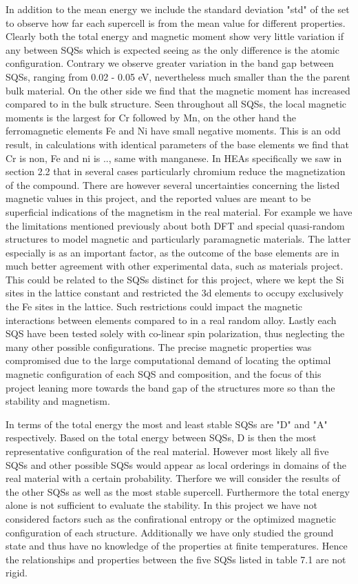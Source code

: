 In addition to the mean energy we include the standard deviation "std" of the set to observe how far each supercell is from the mean value for different properties. Clearly both the total energy and magnetic moment show very little variation if any between SQSs which is expected seeing as the only difference is the atomic configuration. Contrary we observe greater variation in the band gap between SQSs, ranging from 0.02 - 0.05 eV, nevertheless much smaller than the the parent bulk material. On the other side we find that the magnetic moment has increased compared to in the bulk structure. Seen throughout all SQSs, the local magnetic moments is the largest for Cr followed by Mn, on the other hand the ferromagnetic elements Fe and Ni have small negative moments. This is an odd result, in calculations with identical parameters of the base elements we find that Cr is non, Fe and ni is .., same with manganese. In HEAs specifically we saw in section 2.2 that in several cases particularly chromium reduce the magnetization of the compound. There are however several uncertainties concerning the listed magnetic values in this project, and the reported values are meant to be superficial indications of the magnetism in the real material. For example we have the limitations mentioned previously about both DFT and special quasi-random structures to model magnetic and particularly paramagnetic materials. The latter especially is as an important factor, as the outcome of the base elements are in much better agreement with other experimental data, such as materials project. This could be related to the SQSs distinct for this project, where we kept the Si sites in the lattice constant and restricted the 3d elements to occupy exclusively the Fe sites in the lattice. Such restrictions could impact the magnetic interactions between elements compared to in a real random alloy.  Lastly each SQS have been tested solely with co-linear spin polarization, thus neglecting the many other possible configurations. The precise magnetic properties was compromised due to the large computational demand of locating the optimal magnetic configuration of each SQS and composition, and the focus of this project leaning more towards the band gap of the structures more so than the stability and magnetism. 

  
In terms of the total energy the most and least stable SQSs are "D" and "A" respectively. Based on the total energy between SQSs, D is then the most representative configuration of the real material. However most likely all five SQSs and other possible SQSs would appear as local orderings in domains of the real material with a certain probability. Therfore we will consider the results of the other SQSs as well as the most stable supercell. Furthermore the total energy alone is not sufficient to evaluate the stability. In this project we have not considered factors such as the confirational entropy or the optimized magnetic configuration of each structure. Additionally we have only studied the ground state and thus have no knowledge of the properties at finite temperatures. Hence the relationships and properties between the five SQSs listed in table 7.1 are not rigid.  

